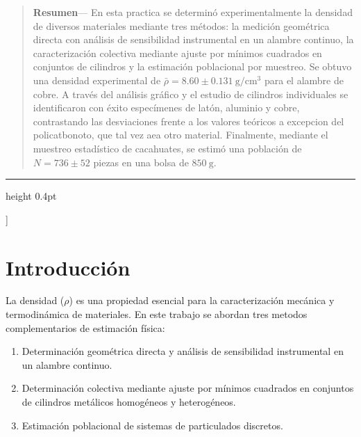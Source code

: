 \documentclass[10pt, letterpaper, twocolumn]{article}
\begin{document}
{  %
  \begin{quotation}
    \small
    \noindent\textbf{Resumen}--- En esta practica se determinó experimentalmente la densidad de diversos materiales mediante tres métodos: la medición geométrica directa con análisis de sensibilidad instrumental en un alambre continuo, la caracterización colectiva mediante ajuste por mínimos cuadrados en conjuntos de cilindros y la estimación poblacional por muestreo. Se obtuvo una densidad experimental de $\bar{\rho} = 8.60 \pm 0.131\ \mathrm{g/cm^3}$ para el alambre de cobre. A través del análisis gráfico y el estudio de cilindros individuales se identificaron con éxito especímenes de latón, aluminio y cobre, contrastando las desviaciones frente a los valores teóricos a excepcion del policatbonoto, que tal vez aea otro material. Finalmente, mediante el muestreo estadístico de cacahuates, se estimó una población de $N = 736 \pm 52$ piezas en una bolsa de $850\ \mathrm{g}$. 
    \vspace{0.35em}

  \end{quotation}

  \vspace{0.35cm}
  \hrule height 0.4pt
  \vspace{0.55cm}
}]


\section{Introducción}
La densidad ($\rho$) es una propiedad esencial para la caracterización mecánica y termodinámica de materiales. En este trabajo se abordan tres metodos complementarios de estimación física:
\begin{enumerate}
    \item Determinación geométrica directa y análisis de sensibilidad instrumental en un alambre continuo.
    \item Determinación colectiva mediante ajuste por mínimos cuadrados en conjuntos de cilindros metálicos homogéneos y heterogéneos.
    \item Estimación poblacional de sistemas de particulados discretos.
\end{enumerate}
\end{document}
